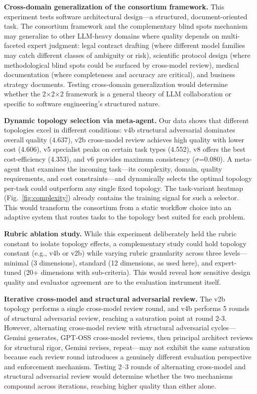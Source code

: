 \documentclass[conference]{IEEEtran}
\begin{document}
\textbf{Cross-domain generalization of the consortium framework.} This experiment tests software architectural design---a structured, document-oriented task. The consortium framework and the complementary blind spots mechanism may generalize to other LLM-heavy domains where quality depends on multi-faceted expert judgment: legal contract drafting (where different model families may catch different classes of ambiguity or risk), scientific protocol design (where methodological blind spots could be surfaced by cross-model review), medical documentation (where completeness and accuracy are critical), and business strategy documents. Testing cross-domain generalization would determine whether the 2$\times$2$\times$2 framework is a general theory of LLM collaboration or specific to software engineering's structured nature.

\textbf{Dynamic topology selection via meta-agent.} Our data shows that different topologies excel in different conditions: v4b structural adversarial dominates overall quality (4.637), v2b cross-model review achieves high quality with lower cost (4.606), v5 specialist peaks on certain task types (4.552), v8 offers the best cost-efficiency (4.353), and v6 provides maximum consistency ($\sigma$=0.080). A meta-agent that examines the incoming task---its complexity, domain, quality requirements, and cost constraints---and dynamically selects the optimal topology per-task could outperform any single fixed topology. The task-variant heatmap (Fig.~\ref{fig:complexity}) already contains the training signal for such a selector. This would transform the consortium from a static workflow choice into an adaptive system that routes tasks to the topology best suited for each problem.

\textbf{Rubric ablation study.} While this experiment deliberately held the rubric constant to isolate topology effects, a complementary study could hold topology constant (e.g., v4b or v2b) while varying rubric granularity across three levels---minimal (3 dimensions), standard (12 dimensions, as used here), and expert-tuned (20+ dimensions with sub-criteria). This would reveal how sensitive design quality and evaluator agreement are to the evaluation instrument itself.

\textbf{Iterative cross-model and structural adversarial review.} The v2b topology performs a single cross-model review round, and v4b performs 5 rounds of structural adversarial review, reaching a saturation point at round 2-3. However, alternating cross-model review with structural adversarial cycles---Gemini generates, GPT-OSS cross-model reviews, then principal architect reviews for structural rigor, Gemini revises, repeat---may not exhibit the same saturation because each review round introduces a genuinely different evaluation perspective and enforcement mechanism. Testing 2--3 rounds of alternating cross-model and structural adversarial review would determine whether the two mechanisms compound across iterations, reaching higher quality than either alone.
\end{document}
